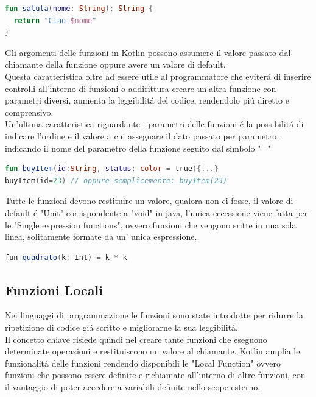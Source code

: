 \begin{lstlisting}[language=Kotlin,caption={Esempio Funzione Kotlin}]
fun saluta(nome: String): String {
  return "Ciao $nome"
}
\end{lstlisting}

Gli argomenti delle funzioni in Kotlin possono assumere il valore passato dal chiamante della funzione oppure avere un valore di default.\\ Questa caratteristica oltre ad essere utile al programmatore che eviter\'a di inserire controlli all'interno di funzioni o addirittura creare un'altra funzione con parametri diversi, aumenta la leggibilit\'a del codice, rendendolo pi\'u diretto e comprensivo.\\
Un'ultima caratteristica riguardante i parametri delle funzioni \'e la possibilit\'a di indicare l'ordine e il valore a cui assegnare il dato passato per parametro, indicando il nome del parametro della funzione seguito dal simbolo "="

\begin{lstlisting}[language=kotlin,caption={Esempio Kotlin Parametri}]
fun buyItem(id:String, status: color = true){...}
buyItem(id=23) // oppure semplicemente: buyItem(23)
\end{lstlisting}

Tutte le funzioni devono restituire un valore, qualora non ci fosse, il valore di default \'e "Unit" corrispondente a "void" in java, l'unica eccessione viene fatta per le "Single expression functions", ovvero funzioni che vengono sritte in una sola linea, solitamente formate da un' unica espressione.
\begin{lstlisting}[language=java,caption={Esempio Single Exp. Function}]
fun quadrato(k: Int) = k * k
\end{lstlisting}

\subsection{Funzioni Locali}
Nei linguaggi di programmazione le funzioni sono state introdotte per ridurre la ripetizione di codice gi\'a scritto e migliorarne la sua leggibilit\'a.\\
Il concetto chiave risiede quindi nel creare tante funzioni che eseguono determinate operazioni e restituiscono un valore al chiamante.
Kotlin amplia le funzionalit\'a delle funzioni rendendo disponibili le "Local Function" ovvero funzioni che possono essere definite e richiamate all'interno di altre funzioni, con il vantaggio di poter accedere a variabili definite nello scope esterno.

